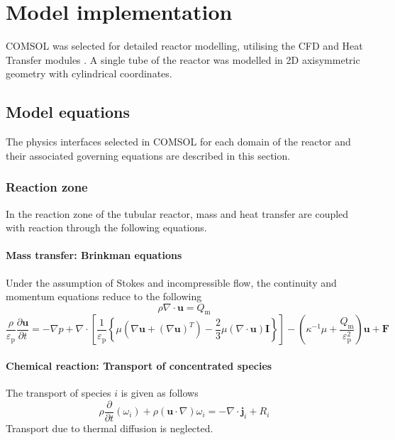 \section{Model implementation}

COMSOL was selected for detailed reactor modelling, utilising the CFD and Heat Transfer modules \cite{comsol_comsol_2020,comsol_cfd_2020,comsol_heat_2020}. A single tube of the reactor was modelled in 2D axisymmetric geometry with cylindrical coordinates.

\subsection{Model equations}
The physics interfaces selected in COMSOL for each domain of the reactor and their associated governing equations are described in this section.

\subsubsection{Reaction zone}

In the reaction zone of the tubular reactor, mass and heat transfer are coupled with reaction through the following equations.

\paragraph{Mass transfer: Brinkman equations}

Under the assumption of Stokes and incompressible flow, the continuity and momentum equations reduce to the following \cite{comsol_cfd_2020}
\begin{equation}
    \rho\nabla \cdot \mathbf{u}=Q_{\mathrm{m}}
\end{equation}
\begin{equation}
    \frac{\rho}{\varepsilon_{\mathrm{p}}} \frac{\partial \mathbf{u}}{\partial t} =
    -\nabla p+\nabla \cdot\left[\frac{1}{\varepsilon_{\mathrm{p}}}\left\{\mu\left(\nabla \mathbf{u}+(\nabla \mathbf{u})^{T}\right)-\frac{2}{3} \mu(\nabla \cdot \mathbf{u}) \mathbf{I}\right\}\right]-\left(\kappa^{-1} \mu+\frac{Q_{\mathrm{m}}}{\varepsilon_{\mathrm{p}}^{2}}\right) \mathbf{u}+\mathbf{F}
\end{equation}

\paragraph{Chemical reaction: Transport of concentrated species}
The transport of species $i$ is given as follows \cite{comsol_cfd_2020}
\begin{equation}
    \rho \frac{\partial}{\partial t}\left(\omega_{i}\right)+\rho(\mathbf{u} \cdot \nabla) \omega_{i}=-\nabla \cdot \mathbf{j}_{i}+R_{i}
\end{equation}
Transport due to thermal diffusion is neglected.

